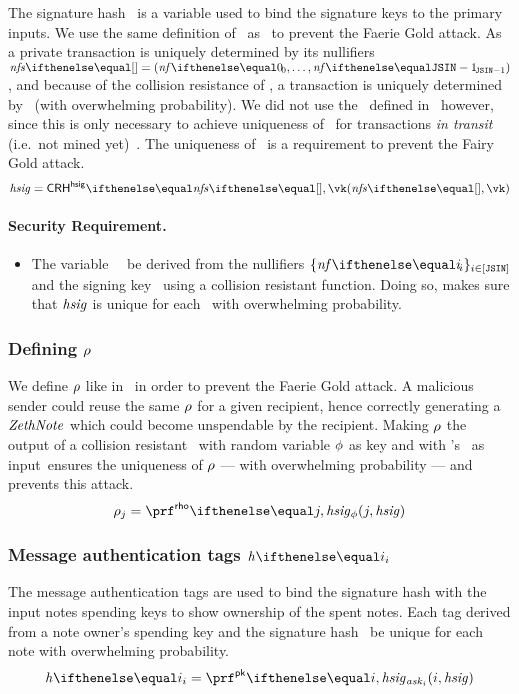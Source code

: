 The signature hash \hsig~is a variable used to bind the signature keys to the primary inputs.
We use the same definition of \hsig~as \zcash~to prevent the Faerie Gold attack. As a private transaction is uniquely determined by its nullifiers $\nfs{} = \smalltuple{\nf{0}, \ldots, \nf{\jsin - 1}}$, and because of the collision resistance of \crhhsig{}, a transaction is uniquely determined by \hsig~(with overwhelming probability). We did not use the \randomSeed~defined in \zcash~however, since this is only necessary to achieve uniqueness of \hsig~for transactions \emph{in transit} (i.e.~not mined yet)~\cite{zcash-randomseed-hsig}.
The uniqueness of \hsig~is a requirement to prevent the Fairy Gold attack.
\[
    \hsig = \crhhsig{\nfs{}, \vk}
\]

\paragraph{Security Requirement.}
\begin{itemize}
    \item The variable \hsig~\MUST~be derived from the nullifiers $\indexedset{\nf{i}}{i \in [\jsin]}$ and the signing key \vk~using a collision resistant function. Doing so, makes sure that $\mathit{hsig}$ is unique for each \zethTx~with overwhelming probability.
\end{itemize}

\subsubsection{Defining $\mathit{\rho}$}\label{zeth-protocol:sec-req:add-notes:def-rho}

We define $\mathit{\rho}$ like in \zcash~in order to prevent the Faerie Gold attack. A malicious sender could reuse the same $\mathit{\rho}$ for a given recipient, hence correctly generating a $\mathit{ZethNote}$ which could become unspendable by the recipient. Making $\mathit{\rho}$ the output of a collision resistant \prf~with random variable $\mathit{\phi}$ as key and with \zethTx's \hsig~as input~ensures the uniqueness of $\mathit{\rho}$ --- with overwhelming probability --- and prevents this attack.
\[
    \rrho_{j} = \prfrho{\pphi}{j, \hsig}
\]

\subsubsection{Message authentication tags $\htag{i}$}\label{zeth-protocol:sec-req:add-notes:def-htag}

The message authentication tags are used to bind the signature hash with the input notes spending keys to show ownership of the spent notes. Each tag derived from a note owner's spending key and the signature hash \MUST~be unique for each note with overwhelming probability.
\[
    \htag{i} = \prfpk{\ask_{i}}{i, \hsig}
\]
